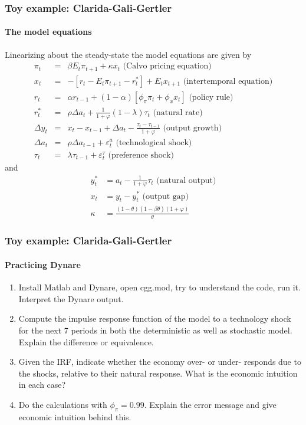 \documentclass[handout]{beamer}  %
\newcounter{saveenumi}
\newcommand{\seti}{\setcounter{saveenumi}{\value{enumi}}}
\begin{document}
\begin{frame}\frametitle{Toy example: Clarida-Gali-Gertler}\framesubtitle{The model equations}
Linearizing about the steady-state the model equations are given by\footnotesize
\begin{eqnarray*}
\pi _{t} &=&\beta E_{t}\pi _{t+1}+\kappa x_{t}\text{ (Calvo pricing equation)} \\
x_{t} &=&-\left[ r_{t}-E_{t}\pi _{t+1}-r_{t}^{\ast }\right] +E_{t}x_{t+1}\text{ (intertemporal equation)} \\
r_{t} &=&\alpha r_{t-1}+(1-\alpha )\left[ \phi _{\pi }\pi _{t}+\phi _{x}x_{t}%
\right] \text{ (policy rule)} \\
r_{t}^{\ast } &=&\rho \Delta a_{t}+\frac{1}{1+\varphi }\left( 1-\lambda
\right) \tau _{t}\text{ (natural rate)} \\
\Delta y_t &=& x_{t} - x_{t-1} + \Delta a_t - \frac{\tau_t - \tau_{t-1}}{1+\varphi} \text{  (output growth)}\\
\Delta a_t &=& \rho \Delta a_{t-1} + \varepsilon_{t}^a \text{  (technological shock)}\\
\tau_t &=& \lambda \tau_{t-1} + \varepsilon_{t}^\tau \text{  (preference shock)}
\end{eqnarray*}
and
\begin{align*}
y_{t}^{\ast } &=a_{t}-\frac{1}{1+\varphi }\tau _{t}\text{ (natural output)}\\
x_{t} &=y_{t}-y_{t}^{\ast }\text{ (output gap)}\\
\kappa &= \frac{(1-\theta)(1-\beta \theta) (1+\varphi)}{\theta}
\end{align*}
\end{frame}

\begin{frame}\frametitle{Toy example: Clarida-Gali-Gertler}\framesubtitle{Practicing Dynare}
\begin{enumerate}
  \item Install Matlab and Dynare, open cgg.mod, try to understand the code, run it. Interpret the Dynare output.
  \item Compute the impulse response function of the model to a technology shock for the next 7 periods in both the deterministic as well as stochastic model. Explain the difference or equivalence.
  \item Given the IRF, indicate whether the economy over- or under- responds due to the shocks, relative to their natural response. What is the economic intuition in each case?
  \item Do the calculations with $\phi_\pi=0.99$. Explain the error message and give economic intuition behind this.
\seti\end{enumerate}
\end{frame}
\end{document}
